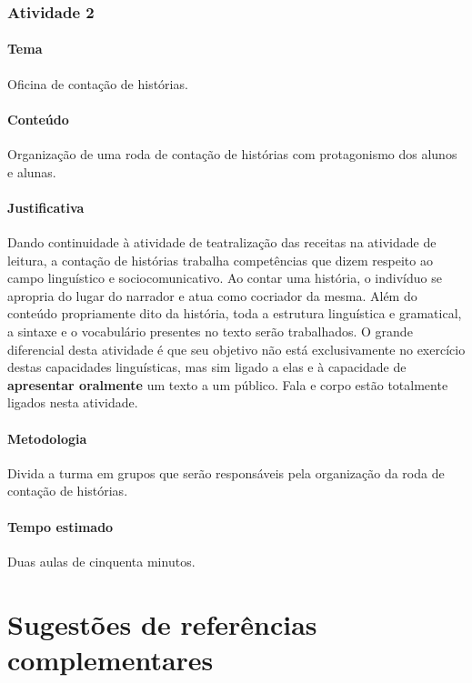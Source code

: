 \documentclass[11pt]{extarticle}
\begin{document}
\subsubsection{Atividade 2}


\paragraph{Tema} Oficina de contação de histórias. 

\paragraph{Conteúdo} Organização de uma roda de contação de histórias
com protagonismo dos alunos e alunas.

\paragraph{Justificativa} Dando continuidade à atividade de teatralização das
receitas na atividade de leitura, a contação de histórias trabalha competências
que dizem respeito ao campo linguístico e sociocomunicativo. 
Ao contar uma história, o indivíduo se apropria do lugar do narrador e
atua como cocriador da mesma. Além do conteúdo propriamente dito 
da história, toda a estrutura linguística e gramatical, a sintaxe 
e o vocabulário presentes no texto serão trabalhados. 
O grande diferencial desta atividade é que seu objetivo não está 
exclusivamente no exercício destas capacidades linguísticas, 
mas sim ligado a elas e à capacidade de \textbf{apresentar oralmente}
um texto a um público. Fala e corpo estão totalmente ligados nesta atividade. 

\paragraph{Metodologia} Divida a turma em grupos que serão 
responsáveis pela organização da roda de contação de histórias. 


\paragraph{Tempo estimado} Duas aulas de cinquenta minutos.


\section{Sugestões de referências complementares}
\end{document}
